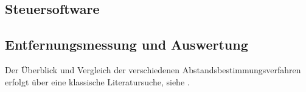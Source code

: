 \begin{comment}
------------------------------------------------------------------------------------------
- Woher kommt die Steuersoftware und wer ist für diese Zustandig?
	- Aktive Entwicklung wurde eingestellt
	- Was kann ich mit dieser Software machen?
- Klassendiagramme der wichtigsten Elemente
	- Auswelchen wichtigen Elementen besteht diese Bibliothek?
	- DW1000
	- DW1000Time
	- DW1000Device
	- DW1000Ranging
- Basisscript
	- Für das DW1000Ranging
	- Wie kann man Daten austauschen?
- Datenaustausch zwischen Host und µC
- Theorie: Ranging (Verfahren)
\end{comment}
\subsection{Steuersoftware}


\begin{comment}
------------------------------------------------------------------------------------------
\end{comment}
\subsection{Entfernungsmessung und Auswertung}

\begin{comment}
\subsection{Entfernungsmessung und Auswertung}
	- Versuchsaufbau
	-
\subsection{Kalibierung}
	- Kalibierung nach DecaWave
		- FlowCharts erklären
		- Ergebnisse auswerten
	- Wo liegen die Problem
	- Script im Anhang
\end{comment}

\begin{comment}
- Mit welchen Einstellungen kommt man auf die Entfernungsmessung?
- Streuung?
- LOS/NLOS {Holz, Bücher, Menschlicher Körper}
	- Welcher Fehler ergibt zwischen LOS/NLOS?
- Wie verändert sich die Genauigkeit der Entfernungsmessung bei einer direkten Sichtverbindung (engl. Line--of--sight (LOS)) und indirekten Sichtverbindung (engl. Non--line--of--sight (NLOS))?
\end{comment}

Der Überblick und Vergleich der verschiedenen Abstandsbestimmungsverfahren erfolgt über eine klassische Literatursuche, siehe \cite{lee2007comparative, herranz2010studying, zekavat2011handbook}.


